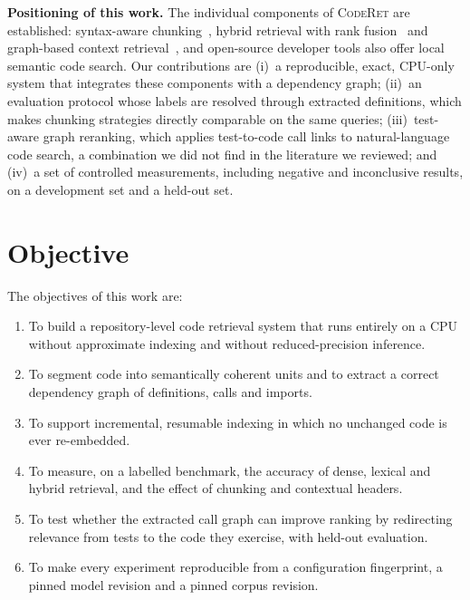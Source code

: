 \documentclass[conference]{IEEEtran}
\newcommand{\sys}{\textsc{CodeRet}}
\begin{document}
\textbf{Positioning of this work.} The individual components of \sys{} are
established: syntax-aware chunking~\cite{zhang2025cast}, hybrid retrieval with
rank fusion~\cite{cormack2009rrf} and graph-based context
retrieval~\cite{phan2024repohyper,liu2024graphcoder}, and open-source developer
tools also offer local semantic code search. Our contributions are (i)~a
reproducible, exact, CPU-only system that integrates these components with a
dependency graph; (ii)~an evaluation protocol whose labels are resolved through
extracted definitions, which makes chunking strategies directly comparable on the
same queries; (iii)~test-aware graph reranking, which applies test-to-code call
links to natural-language code search, a combination we did not find in the
literature we reviewed; and (iv)~a set of controlled measurements, including
negative and inconclusive results, on a development set and a held-out set.

\section{Objective}
The objectives of this work are:
\begin{enumerate}
  \item To build a repository-level code retrieval system that runs entirely on
        a CPU without approximate indexing and without reduced-precision
        inference.
  \item To segment code into semantically coherent units and to extract a
        correct dependency graph of definitions, calls and imports.
  \item To support incremental, resumable indexing in which no unchanged code
        is ever re-embedded.
  \item To measure, on a labelled benchmark, the accuracy of dense, lexical and
        hybrid retrieval, and the effect of chunking and contextual headers.
  \item To test whether the extracted call graph can improve ranking by
        redirecting relevance from tests to the code they exercise, with
        held-out evaluation.
  \item To make every experiment reproducible from a configuration fingerprint,
        a pinned model revision and a pinned corpus revision.
\end{enumerate}

\end{document}
